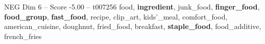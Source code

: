 \begin{textsample}{NEG Dim 6 – Score -5.00 – t007256}  \label{ex:f6_neg_040}
food, \textbf{ingredient}, junk\_food, \textbf{finger\_food}, \textbf{food\_group}, \textbf{fast\_food}, recipe, clip\_art, kids'\_meal, comfort\_food, american\_cuisine, doughnut, fried\_food, breakfast, \textbf{staple\_food}, food\_additive, french\_fries

\end{textsample}
